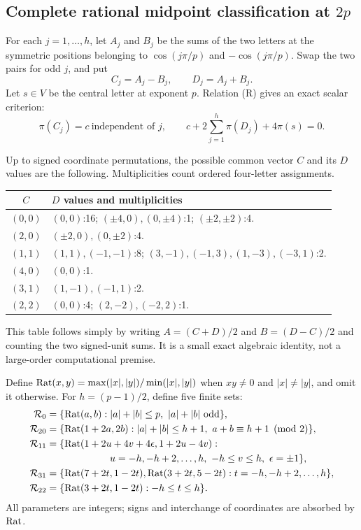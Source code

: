 \subsection{Complete rational midpoint classification at \texorpdfstring{$2p$}{2p}}\label{ext:sec:mid}
For each $j=1,\ldots,h$, let $A_j$ and $B_j$ be the sums of the two letters at the symmetric positions belonging to $\cos(j\pi/p)$ and $-\cos(j\pi/p)$. Swap the two pairs for odd $j$, and put
\[
C_j=A_j-B_j,\qquad D_j=A_j+B_j.
\]
Let $s\in V$ be the central letter at exponent $p$. Relation (R) gives an exact scalar criterion:
\[
\pi(C_j)=c\ \text{independent of }j,
\qquad c+2\sum_{j=1}^h\pi(D_j)+4\pi(s)=0.                \tag{M}
\]

Up to signed coordinate permutations, the possible common vector $C$ and its $D$ values are the following. Multiplicities count ordered four-letter assignments.
\begin{center}\small\begin{tabular}{c p{9.9cm}}\toprule
$C$ & $D$ values and multiplicities\\\midrule
$(0,0)$ & $(0,0)$:16; $(\pm4,0),(0,\pm4)$:1; $(\pm2,\pm2)$:4.\\
$(2,0)$ & $(\pm2,0),(0,\pm2)$:4.\\
$(1,1)$ & $(1,1),(-1,-1)$:8; $(3,-1),(-1,3),(1,-3),(-3,1)$:2.\\
$(4,0)$ & $(0,0)$:1.\\
$(3,1)$ & $(1,-1),(-1,1)$:2.\\
$(2,2)$ & $(0,0)$:4; $(2,-2),(-2,2)$:1.\\\bottomrule
\end{tabular}\end{center}
This table follows simply by writing $A=(C+D)/2$ and $B=(D-C)/2$ and counting the two signed-unit sums. It is a small exact algebraic identity, not a large-order computational premise.

Define $\operatorname{Rat}(x,y)=\max(|x|,|y|)/\min(|x|,|y|)$ when $xy\ne0$ and $|x|\ne|y|$, and omit it otherwise. For $h=(p-1)/2$, define five finite sets:
\begin{align*}
\mathcal R_0={}&\{\Rat(a,b): |a|+|b|\le p,\ |a|+|b|\text{ odd}\},\\
\mathcal R_{20}={}&\{\Rat(1+2a,2b): |a|+|b|\le h+1,\ a+b\equiv h+1\pmod2\},\\
\mathcal R_{11}={}&\{\Rat(1+2u+4v+4\epsilon,1+2u-4v):\\
 &\hspace{18mm} u=-h,-h+2,\ldots,h,\ -h\le v\le h,\ \epsilon=\pm1\},\\
\mathcal R_{31}={}&\{\Rat(7+2t,1-2t),\Rat(3+2t,5-2t):t=-h,-h+2,\ldots,h\},\\
\mathcal R_{22}={}&\{\Rat(3+2t,1-2t):-h\le t\le h\}.
\end{align*}
All parameters are integers; signs and interchange of coordinates are absorbed by $\operatorname{Rat}$.

